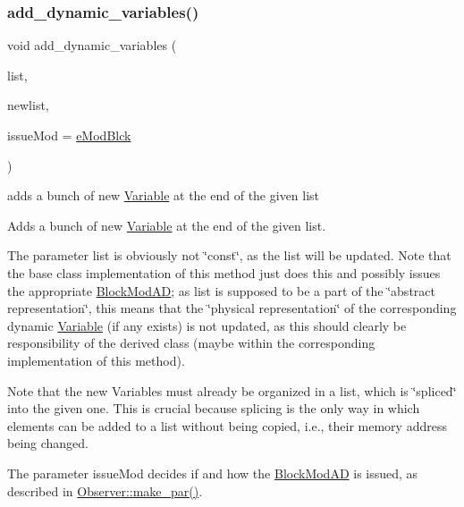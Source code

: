 \subsubsection{\texorpdfstring{add\+\_\+dynamic\+\_\+variables()}{add\_dynamic\_variables()}\hspace{0.1cm}{\footnotesize\ttfamily [1/2]}}
{\footnotesize\ttfamily void add\+\_\+dynamic\+\_\+variables (\begin{DoxyParamCaption}\item[{std\+::list$<$ Var $>$ \&}]{list,  }\item[{std\+::list$<$ Var $>$ \&}]{newlist,  }\item[{\mbox{\hyperlink{group___modification___t_y_p_e_s_ga544246d8c462e9a2d817c2c30797968f}{c\+\_\+\+Mod\+Param}}}]{issue\+Mod = {\ttfamily \mbox{\hyperlink{group___modification___t_y_p_e_s_gga48fddcdd03a03f49b7e389ca1ed938d4a21b14b26b1c0093a0905f6fc010bad29}{e\+Mod\+Blck}}} }\end{DoxyParamCaption})}



adds a bunch of new \mbox{\hyperlink{class_s_m_spp__di__unipi__it_1_1_variable}{Variable}} at the end of the given list 

Adds a bunch of new \mbox{\hyperlink{class_s_m_spp__di__unipi__it_1_1_variable}{Variable}} at the end of the given list.

The parameter list is obviously not \char`\"{}const\char`\"{}, as the list will be updated. Note that the base class implementation of this method just does this and possibly issues the appropriate \mbox{\hyperlink{class_s_m_spp__di__unipi__it_1_1_block_mod_a_d}{Block\+Mod\+AD}}; as list is supposed to be a part of the \char`\"{}abstract representation\char`\"{}, this means that the \char`\"{}physical
representation\char`\"{} of the corresponding dynamic \mbox{\hyperlink{class_s_m_spp__di__unipi__it_1_1_variable}{Variable}} (if any exists) is not updated, as this should clearly be responsibility of the derived class (maybe within the corresponding implementation of this method).

Note that the new Variables must already be organized in a list, which is \char`\"{}spliced\char`\"{} into the given one. This is crucial because splicing is the only way in which elements can be added to a list without being copied, i.\+e., their memory address being changed.

The parameter issue\+Mod decides if and how the \mbox{\hyperlink{class_s_m_spp__di__unipi__it_1_1_block_mod_a_d}{Block\+Mod\+AD}} is issued, as described in \mbox{\hyperlink{class_s_m_spp__di__unipi__it_1_1_observer_a2d499ae38e5e95cf66cd71da32b0694a}{Observer\+::make\+\_\+par()}}. \mbox{\label{class_s_m_spp__di__unipi__it_1_1_block_a0f706ade0e807e37f00e1d49d5e23707}} 
